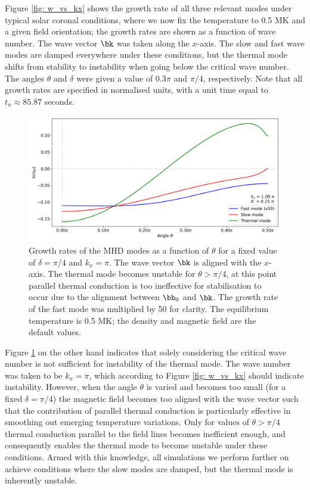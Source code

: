 Figure \ref{fig: w_vs_kx} shows the growth rate of all three relevant modes under typical solar coronal conditions, where we now fix the temperature to 0.5 MK and a given field orientation; the growth rates are shown as a function of wave number. The wave vector $\bk$ was taken along the $x$-axis. The slow and fast wave modes are damped everywhere under these conditions, but the thermal mode shifts from stability to instability when going below the critical wave number. The angles $\theta$ and $\delta$ were given a value of $0.3\pi$ and $\pi/4$, respectively. Note that all growth rates are specified in normalised units, with a unit time equal to $t_n \approx 85.87$ seconds.

\begin{figure}[t]
  \centering
  \includegraphics[width=\textwidth]{w_vs_theta.png}
  \caption{
    Growth rates of the MHD modes as a function of $\theta$ for a fixed value of $\delta = \pi/4$ and $k_x = \pi$. The wave vector $\bk$ is aligned with the $x$-axis. The thermal mode becomes unstable for $\theta > \pi/4$, at this point parallel thermal conduction is too ineffective for stabilisation to occur due to the alignment between $\bb_0$ and $\bk$. The growth rate of the fast mode was multiplied by 50 for clarity. The equilibrium temperature is 0.5 MK; the density and magnetic field are the default values.
  }
  \label{fig: w_vs_theta}
\end{figure}

Figure \ref{fig: w_vs_theta} on the other hand indicates that solely considering the critical wave number is not sufficient for instability of the thermal mode. The wave number was taken to be $k_x = \pi$, which according to Figure \ref{fig: w_vs_kx} should indicate instability. However, when the angle $\theta$ is varied and becomes too small (for a fixed $\delta = \pi/4$) the magnetic field becomes too aligned with the wave vector such that the contribution of parallel thermal conduction is particularly effective in smoothing out emerging temperature variations. Only for values of $\theta > \pi/4$ thermal conduction parallel to the field lines becomes inefficient enough, and consequently enables the thermal mode to become unstable under these conditions. Armed with this knowledge, all simulations we perform further on achieve conditions where the slow modes are damped, but the thermal mode is inherently unstable.









